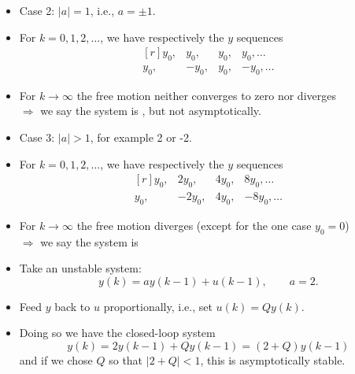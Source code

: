\begin{frame}
\myPause
 \begin{itemize}[<+-| alert@+>]
 \item Case 2: $|a|=1$, i.e., $a=\pm 1$.\\
 \item[] For $k=0,1,2,\ldots$, we have respectively the $y$ sequences
       \begin{displaymath}
        \begin{matrix*}[r]
          y_0, &  y_0, & y_0, &  y_0, \ldots \\
          y_0, & -y_0, & y_0, & -y_0, \ldots
        \end{matrix*}
       \end{displaymath}       
 \item[] For $k\rightarrow\infty$ the free motion neither converges to zero nor diverges\\
         $\Rightarrow$ we say the system is , but not asymptotically.
 \item \vfill Case 3: $|a|>1$, for example 2 or -2.\\
 \item[] For $k=0,1,2,\ldots$, we have respectively the $y$ sequences
       \begin{displaymath}
        \begin{matrix*}[r]
          y_0, &  2y_0, & 4y_0, &  8y_0, \ldots \\
          y_0, & -2y_0, & 4y_0, & -8y_0, \ldots
        \end{matrix*}
       \end{displaymath}
 \item[] For $k\rightarrow\infty$ the free motion diverges (except for the one case $y_0=0$)\\
         $\Rightarrow$ we say the system is  
 \end{itemize}
\end{frame}


\begin{frame}
\myPause
 \begin{itemize}[<+-| alert@+>]
 \item Take an unstable system:
       \begin{displaymath}
        y(k) = ay(k-1)+u(k-1), \qquad a=2.
       \end{displaymath}
 \item Feed $y$ back to $u$ proportionally, i.e., set $u(k) = Qy(k)$.
 \item Doing so we have the closed-loop system
       \begin{displaymath}
        y(k) = 2y(k-1)+Qy(k-1) = (2+Q)y(k-1)
       \end{displaymath}
       and if we chose $Q$ so that $|2+Q|<1$, this is asymptotically stable.
 \end{itemize}
\end{frame}

